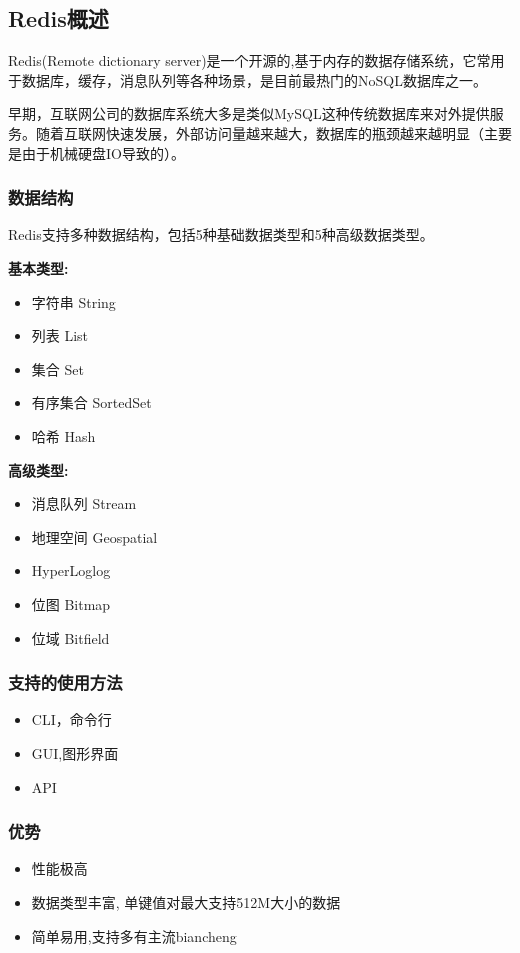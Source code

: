 
\begin{issues}
\issueDraft
\issueTODO
\end{issues}

\subsection{Redis概述}

Redis(Remote dictionary server)是一个开源的,基于内存的数据存储系统，它常用于数据库，缓存，消息队列等各种场景，是目前最热门的NoSQL数据库之一。

早期，互联网公司的数据库系统大多是类似MySQL这种传统数据库来对外提供服务。随着互联网快速发展，外部访问量越来越大，数据库的瓶颈越来越明显（主要是由于机械硬盘IO导致的）。

\subsubsection{数据结构 }
Redis支持多种数据结构，包括5种基础数据类型和5种高级数据类型。

\textbf{基本类型:}

\begin{itemize}
\item 字符串 String
\item 列表 List
\item 集合 Set
\item 有序集合 SortedSet
\item 哈希 Hash
\end{itemize}

\textbf{高级类型:}

\begin{itemize}
\item 消息队列 Stream
\item 地理空间 Geospatial
\item HyperLoglog
\item 位图 Bitmap
\item 位域 Bitfield
\end{itemize}

\subsubsection{支持的使用方法}
\begin{itemize}
\item CLI，命令行
\item GUI,图形界面
\item API
\end{itemize}

\subsubsection{优势}
\begin{itemize}
\item 性能极高
\item 数据类型丰富, 单键值对最大支持512M大小的数据
\item 简单易用,支持多有主流biancheng
\end{itemize}